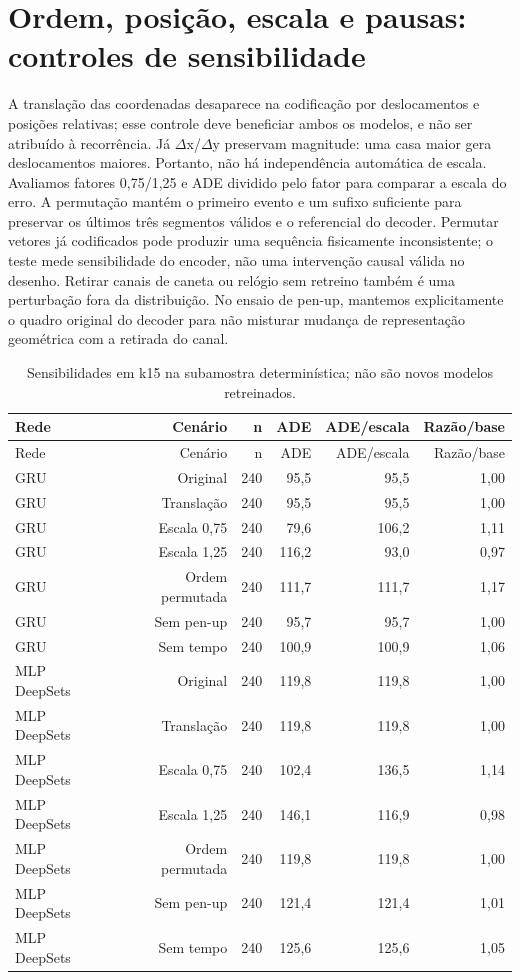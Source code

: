 \documentclass[11pt,a4paper]{article}
\begin{document}
\section{Ordem, posição, escala e pausas: controles de sensibilidade}
A translação das coordenadas desaparece na codificação por deslocamentos e posições relativas; esse controle deve beneficiar ambos os modelos, e não ser atribuído à recorrência. Já $\Delta$x/$\Delta$y preservam magnitude: uma casa maior gera deslocamentos maiores. Portanto, não há independência automática de escala. Avaliamos fatores 0,75/1,25 e ADE dividido pelo fator para comparar a escala do erro. A permutação mantém o primeiro evento e um sufixo suficiente para preservar os últimos três segmentos válidos e o referencial do decoder. Permutar vetores já codificados pode produzir uma sequência fisicamente inconsistente; o teste mede sensibilidade do encoder, não uma intervenção causal válida no desenho. Retirar canais de caneta ou relógio sem retreino também é uma perturbação fora da distribuição. No ensaio de pen-up, mantemos explicitamente o quadro original do decoder para não misturar mudança de representação geométrica com a retirada do canal.
\begingroup\small\setlength{\tabcolsep}{4pt}\begin{longtable}{lrrrrr}
\caption{Sensibilidades em k15 na subamostra determinística; não são novos modelos retreinados.}\\
\toprule
Rede & Cenário & n & ADE & ADE/escala & Razão/base \\ 
\midrule\endfirsthead
\toprule
Rede & Cenário & n & ADE & ADE/escala & Razão/base \\ 
\midrule\endhead
\bottomrule\endfoot
GRU & Original & 240 & 95,5 & 95,5 & 1,00 \\
GRU & Translação & 240 & 95,5 & 95,5 & 1,00 \\
GRU & Escala 0,75 & 240 & 79,6 & 106,2 & 1,11 \\
GRU & Escala 1,25 & 240 & 116,2 & 93,0 & 0,97 \\
GRU & Ordem permutada & 240 & 111,7 & 111,7 & 1,17 \\
GRU & Sem pen-up & 240 & 95,7 & 95,7 & 1,00 \\
GRU & Sem tempo & 240 & 100,9 & 100,9 & 1,06 \\
MLP DeepSets & Original & 240 & 119,8 & 119,8 & 1,00 \\
MLP DeepSets & Translação & 240 & 119,8 & 119,8 & 1,00 \\
MLP DeepSets & Escala 0,75 & 240 & 102,4 & 136,5 & 1,14 \\
MLP DeepSets & Escala 1,25 & 240 & 146,1 & 116,9 & 0,98 \\
MLP DeepSets & Ordem permutada & 240 & 119,8 & 119,8 & 1,00 \\
MLP DeepSets & Sem pen-up & 240 & 121,4 & 121,4 & 1,01 \\
MLP DeepSets & Sem tempo & 240 & 125,6 & 125,6 & 1,05 \\
\end{longtable}\endgroup
\end{document}
